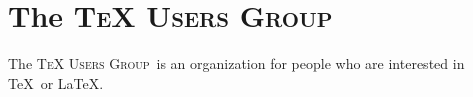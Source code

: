 \documentclass{article}
\newcommand{\TUG}{\textsc{TeX Users Group}}
\begin{document}
\section{The \TUG}
The \TUG\ is an organization for people who are interested in
\TeX\ or \LaTeX.
\end{document}
